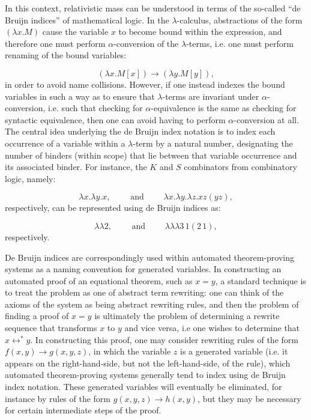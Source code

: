 \documentclass{article}
\begin{document}
In this context, relativistic mass can be understood in terms of the so-called ``de Bruijn indices''\cite{bruijn} of mathematical logic. In the ${\lambda}$-calculus, abstractions of the form ${\left( \lambda x . M \right)}$ cause the variable $x$ to become bound within the expression, and therefore one must perform ${\alpha}$-conversion of the ${\lambda}$-terms, i.e. one must perform renaming of the bound variables\cite{gabbay}:

\begin{equation}
\left( \lambda x . M \left[ x \right] \right) \to \left( \lambda y . M \left[ y \right] \right),
\end{equation}
in order to avoid name collisions. However, if one instead indexes the bound variables in such a way as to ensure that ${\lambda}$-terms are invariant under ${\alpha}$-conversion, i.e. such that checking for ${\alpha}$-equivalence is the same as checking for syntactic equivalence, then one can avoid having to perform ${\alpha}$-conversion at all. The central idea underlying the de Bruijn index notation is to index each occurrence of a variable within a ${\lambda}$-term by a natural number, designating the number of binders (within scope) that lie between that variable occurrence and its associated binder. For instance, the $K$ and $S$ combinators from combinatory logic, namely:

\begin{equation}
\lambda x . \lambda y . x, \qquad \text{ and } \qquad \lambda x . \lambda y . \lambda z . x z \left( y z \right),
\end{equation}
respectively, can be represented using de Bruijn indices as:

\begin{equation}
\lambda \lambda 2, \qquad \text{ and } \qquad \lambda \lambda \lambda 3 \, 1 \left( 2 \, 1 \right),
\end{equation}
respectively.

De Bruijn indices are correspondingly used within automated theorem-proving systems as a naming convention for generated variables. In constructing an automated proof of an equational theorem, such as ${x = y}$, a standard technique is to treat the problem as one of abstract term rewriting: one can think of the axioms of the system as being abstract rewriting rules, and then the problem of finding a proof of ${x = y}$ is ultimately the problem of determining a rewrite sequence that transforms $x$ to $y$ and vice versa, i.e one wishes to determine that ${x \leftrightarrow^{*} y}$. In constructing this proof, one may consider rewriting rules of the form ${f \left( x, y \right) \to g \left( x, y, z \right)}$, in which the variable $z$ is a generated variable (i.e. it appears on the right-hand-side, but not the left-hand-side, of the rule), which automated theorem-proving systems generally tend to index using de Bruijn index notation. These generated variables will eventually be eliminated, for instance by rules of the form ${g \left( x, y, z \right) \to h \left( x, y \right)}$, but they may be necessary for certain intermediate steps of the proof.
\end{document}

